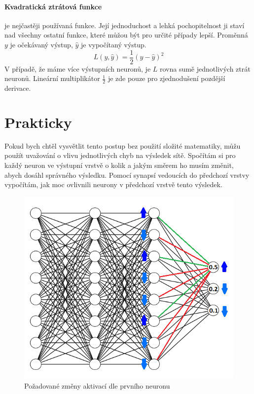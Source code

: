 \documentclass[12pt,a4paper]{report}
\begin{document}
	\paragraph{Kvadratická ztrátová funkce}
	je nejčastěji používaná funkce. Její jednoduchost a lehká pochopitelnost ji staví nad všechny ostatní funkce, které můžou být pro určité případy lepší. Proměnná $y$ je očekávaný výstup, $\hat{y}$ je vypočítaný výstup.
	$$L(y,\hat{y})=\frac{1}{2}(y-\hat{y})^2$$
	V případě, že máme více výstupních neuronů, je $L$ rovna sumě jednotlivých ztrát neuronů. Lineární multiplikátor $\frac{1}{2}$ je zde pouze pro zjednodušení pozdější derivace.
	
	\section{Prakticky}
	Pokud bych chtěl vysvětlit tento postup bez použití složité matematiky, můžu použít uvažování o vlivu jednotlivých chyb na výsledek sítě. Spočítám si pro každý neuron ve výstupní vrstvě o kolik a jakým směrem ho musím změnit, abych dosáhl správného výsledku. Pomocí synapsí vedoucích do předchozí vrstvy vypočítám, jak moc ovlivnili neurony v předchozí vrstvě tento výsledek.
	
	\begin{figure}[h]
		\centering
		\includegraphics[width=15cm]{images/nn8-8-8-3_krok_1}
		\caption{Požadované změny aktivací dle prvního neuronu}
	\end{figure}
	
\end{document}
